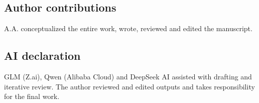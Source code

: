 \documentclass[10pt,twocolumn]{article}
\theoremstyle{plain}
\theoremstyle{definition}
\theoremstyle{remark}
\begin{document}
\subsection*{Author contributions}
A.A. conceptualized the entire work, wrote, reviewed and edited the manuscript.

\subsection*{AI declaration}
GLM (Z.ai), Qwen (Alibaba Cloud) and DeepSeek AI assisted with drafting
and iterative review. The author reviewed and edited outputs and takes
responsibility for the final work.
\end{document}
